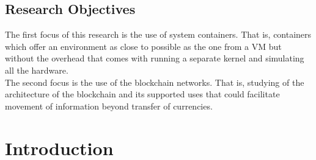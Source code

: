 \documentclass[a4paper,12pt]{article}
\begin{document}
	\subsection{Research Objectives}
	{\par The first focus of this research is the use of system containers. That is, containers which offer an environment as close to possible as the one from a \ac{VM} but without the overhead that comes with running a separate kernel and simulating all the hardware.\\\newline The second focus is the use of the blockchain networks. That is, studying of the architecture of the blockchain and its supported uses that could facilitate movement of information beyond transfer of currencies.}
	\newpage
	\section{Introduction}
\end{document}
